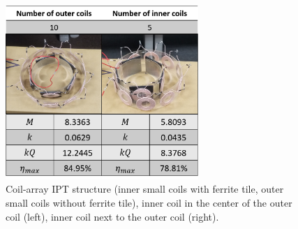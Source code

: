 \begin{figure}[!t]
    \centering
    \includegraphics[width=0.65\textwidth]{images/4_coil_6_10_inner_with_ferrite.png}
    \caption{Coil-array IPT structure (inner small coils with ferrite tile, outer small coils without ferrite tile), inner coil in the center of the outer coil (left), inner coil next to the outer coil (right).}
    \label{fig: coil-array result3}
\end{figure}


